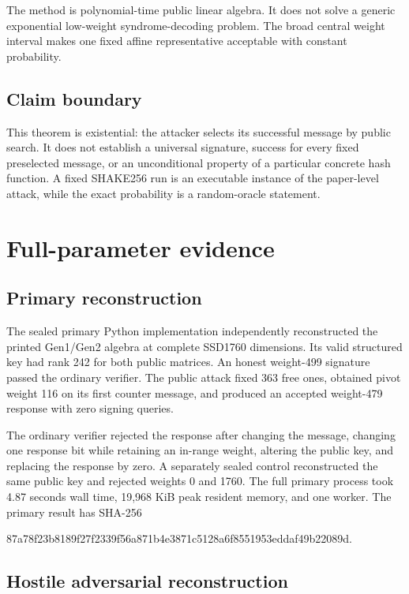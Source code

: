 \documentclass[10pt,a4paper]{article}
\begin{document}
The method is polynomial-time public linear algebra. It does not solve a
generic exponential low-weight syndrome-decoding problem. The broad central
weight interval makes one fixed affine representative acceptable with
constant probability.

\subsection{Claim boundary}

This theorem is existential: the attacker selects its successful message by
public search. It does not establish a universal signature, success for every
fixed preselected message, or an unconditional property of a particular
concrete hash function. A fixed SHAKE256 run is an executable instance of the
paper-level attack, while the exact probability is a random-oracle statement.

\section{Full-parameter evidence}

\subsection{Primary reconstruction}

The sealed primary Python implementation independently reconstructed the
printed Gen1/Gen2 algebra at complete SSD1760 dimensions. Its valid structured
key had rank 242 for both public matrices. An honest weight-499 signature
passed the ordinary verifier. The public attack fixed 363 free ones, obtained
pivot weight 116 on its first counter message, and produced an accepted
weight-479 response with zero signing queries.

The ordinary verifier rejected the response after changing the message,
changing one response bit while retaining an in-range weight, altering the
public key, and replacing the response by zero. A separately sealed control
reconstructed the same public key and rejected weights 0 and 1760. The full
primary process took 4.87 seconds wall time, 19,968 KiB peak resident memory,
and one worker. The primary result has SHA-256
\begin{center}
\small\ttfamily
87a78f23b8189f27f2339f56a871b4e3871c5128a6f8551953eddaf49b22089d.
\end{center}

\subsection{Hostile adversarial reconstruction}
\end{document}
